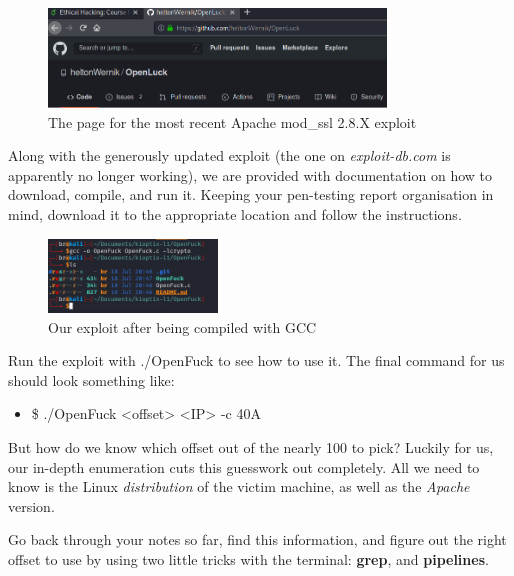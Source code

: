 \documentclass[a4paper,11pt]{article}
\renewcommand{\tt}[2][tt]{\textcolor{#1}{\ttfamily #2}}%
\begin{document}
\begin{figure}[h]
    \centering
    \includegraphics[width=0.8\textwidth]{images/openLuckURL.png}
    \caption{The page for the most recent Apache \tt{mod\_ssl} 2.8.X exploit}
\end{figure}

Along with the generously updated exploit (the one on \textit{exploit-db.com} is apparently no longer working), we are provided with documentation on how to download, compile, and run it. Keeping your pen-testing report organisation in mind, download it to the appropriate location and follow the instructions.

\begin{figure}[h]
    \centering
    \includegraphics[width=0.4\textwidth]{images/compiledOpenLuck.png}
    \caption[GCC caption]{Our exploit after being compiled with GCC\protect\footnotemark[3]}
    \label{fig:gcctrans2open}
\end{figure}

Run the exploit with \tt{./OpenFuck} to see how to use it. The final command for us should look something like:
\begin{itemize}
    \item \tt{\$ ./OpenFuck <offset> <IP> -c 40}A
\end{itemize}
But how do we know which offset out of the nearly 100 to pick? Luckily for us, our in-depth enumeration cuts this guesswork out completely. All we need to know is the Linux \textit{distribution} of the victim machine, as well as the \textit{Apache} version.
\pagebreak

Go back through your notes so far, find this information, and figure out the right offset to use by using two little tricks with the terminal: {\bfseries grep}, and {\bfseries pipelines}.
\end{document}
